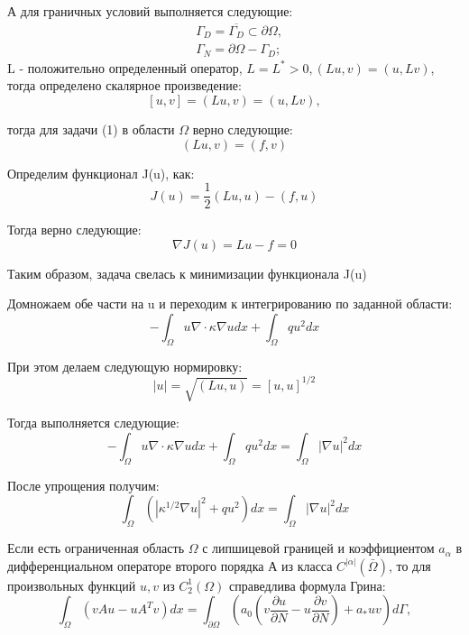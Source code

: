 \documentclass[a4paper, 12pt]{article}%
\begin{document}
	А для граничных условий выполняется следующие:
	$$
	\begin{aligned}
		& \Gamma_D=\overline{\Gamma_D} \subset \partial \Omega, \\
		& \Gamma_N=\partial \Omega-\Gamma_D ;
	\end{aligned}
	$$
	$\mathrm{L}$ - положительно определенный оператор, $L=L^*>0,(L u, v)=(u, L v)$, тогда определено скалярное произведение:
	$$
	[u, v]=(L u, v)=(u, L v),
	$$
	
	тогда для задачи (1) в области $\Omega$ верно следующие:
	$$
	(L u, v)=(f, v)
	$$
	
	Определим функционал J(u), как:
	$$
	J(u)=\frac{1}{2}(L u, u)-(f, u)
	$$
	
	Тогда верно следующие:
	$$
	\nabla J(u)=L u-f=0
	$$
	
	Таким образом, задача свелась к минимизации функционала J(u)

	 
	Домножаем обе части на u и переходим к интегрированию по заданной области:
	$$
	-\int_{\Omega} u \nabla \cdot \kappa \nabla u d x+\int_{\Omega} q u^2 d x
	$$
	
	При этом делаем следующую нормировку:
	$$
	|u|=\sqrt{(L u, u)}=[u, u]^{1 / 2}
	$$
	
	Тогда выполняется следующие:
	$$
	-\int_{\Omega} u \nabla \cdot \kappa \nabla u d x+\int_{\Omega} q u^2 d x=\int_{\Omega}|\nabla u|^2 d x
	$$
	
	После упрощения получим:
	$$
	\int_{\Omega}\left(\left|\kappa^{1 / 2} \nabla u\right|^2+q u^2\right) d x=\int_{\Omega}|\nabla u|^2 d x
	$$

	Если есть ограниченная область $\Omega$ с липшицевой границей и коэффициентом $a_{\alpha}$ в дифференциальном операторе второго порядка А из класса $C^{|\alpha|}(\bar{\Omega})$, то для произвольных функций $u, v$ из $C_2^1(\Omega)$ справедлива формула Грина:
	$$
	\int_{\Omega}\left(v A u-u A^T v\right) d x=\int_{\partial \Omega}\left(a_0\left(v \frac{\partial u}{\partial N}-u \frac{\partial v}{\partial N}\right)+a_* u v\right) d \Gamma,
	$$
	
\end{document}
